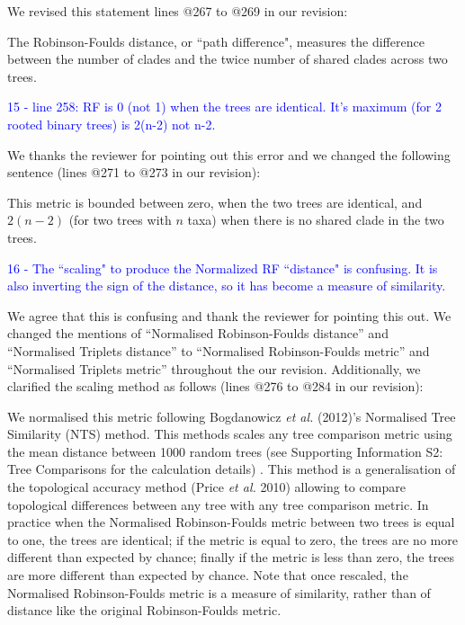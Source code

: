 \documentclass[11pt]{letter}
\begin{document}
\begin{letter}{}
We revised this statement lines @267 to @269 in our revision:

\hfill\begin{minipage}{\dimexpr\textwidth-1cm}
The Robinson-Foulds distance, or ``path difference", measures the difference between the number of clades and the twice number of shared clades across two trees.
\end{minipage}


\textcolor{blue}{15 - line 258: RF is 0 (not 1) when the trees are identical. It's maximum (for 2 rooted binary trees) is 2(n-2) not n-2.}

We thanks the reviewer for pointing out this error and we changed the following sentence (lines @271 to @273 in our revision):

\hfill\begin{minipage}{\dimexpr\textwidth-1cm}
This metric is bounded between zero, when the two trees are identical, and $2(n-2)$ (for two trees with $n$ taxa) when there is no shared clade in the two trees.
\end{minipage}


\textcolor{blue}{16 - The ``scaling" to produce the Normalized RF ``distance" is confusing. It is also inverting the sign of the distance, so it has become a measure of similarity.}

We agree that this is confusing and thank the reviewer for pointing this out. We changed the mentions of ``Normalised Robinson-Foulds distance'' and ``Normalised Triplets distance'' to ``Normalised Robinson-Foulds metric'' and ``Normalised Triplets metric'' throughout the our revision. Additionally, we clarified the scaling method as follows (lines @276 to @284 in our revision):

\hfill\begin{minipage}{\dimexpr\textwidth-1cm}
We normalised this metric following Bogdanowicz \textit{et al.} (2012)'s Normalised Tree Similarity (NTS) method. This methods scales %
any tree comparison metric using the mean distance between 1000 random trees (see Supporting Information S2: Tree Comparisons for the calculation details)
. This method is a generalisation of the topological accuracy method (Price \textit{et al.} 2010) allowing to compare topological differences between any tree with any tree comparison metric. In practice when the Normalised Robinson-Foulds metric between two trees is equal to one, the trees are identical; if the metric is equal to zero, the trees are no more different than expected by chance; finally if the metric is less than zero, the trees are more different than expected by chance. Note that once rescaled, the Normalised Robinson-Foulds metric is a measure of similarity, rather than of distance like the original Robinson-Foulds metric. 
\end{minipage}


\end{letter}
\end{document}
